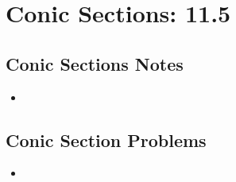 \chapter{Conic Sections: 11.5}

\section{Conic Sections Notes}
\begin{itemize}
  \item
\end{itemize}

\section{Conic Section Problems}
\begin{itemize}
  \item
\end{itemize}
